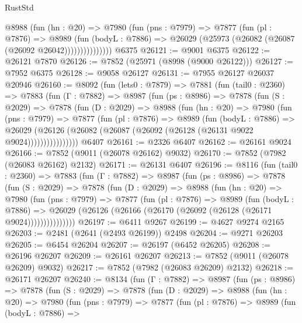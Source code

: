 \begin{lexlean}{RustStd}
\begin{coremodule}
                @8988
                  (fun (hn : @20) =>
                  @7980
                    (fun (pns : @7979) =>
                    @7877
                      (fun (pl : @7876) =>
                      @8989
                        (fun (bodyL : @7886) =>
                        @26029 (@25973 (@26082 (@26087 (@26092 @26042)))))))))))))))
    @6375
@26121 := @9001 @6375
@26122 := @26121 @7870
@26126 := @7852 (@25971 (@8998 (@9000 @26122)))
@26127 := @7952 @6375
@26128 := @9058 @26127
@26131 := @7955 @26127 @26037 @20946
@26160 := @8092
    (fun (lets0 : @7879) =>
    @7881
      (fun (tail0 : @2360) =>
      @7883
        (fun (Γ : @7882) =>
        @8987
          (fun (ps : @8986) =>
          @7878
            (fun (S : @2029) =>
            @7878
              (fun (D : @2029) =>
              @8988
                (fun (hn : @20) =>
                @7980
                  (fun (pns : @7979) =>
                  @7877
                    (fun (pl : @7876) =>
                    @8989
                      (fun (bodyL : @7886) =>
                      @26029
                        (@26126 (@26082 (@26087 (@26092 (@26128 (@26131 @9022 @9024))))))))))))))))
    @6407
@26161 := @2326 @6407
@26162 := @26161 @9024
@26166 := @7852 (@9011 (@26078 @26162) @9032)
@26170 := @7852 (@7982 (@26083 @26162) @2132)
@26171 := @26131 @6407
@26196 := @8116
    (fun (tail0 : @2360) =>
    @7883
      (fun (Γ : @7882) =>
      @8987
        (fun (ps : @8986) =>
        @7878
          (fun (S : @2029) =>
          @7878
            (fun (D : @2029) =>
            @8988
              (fun (hn : @20) =>
              @7980
                (fun (pns : @7979) =>
                @7877
                  (fun (pl : @7876) =>
                  @8989
                    (fun (bodyL : @7886) =>
                    @26029 (@26126 (@26166 (@26170 (@26092 (@26128 (@26171 @9024)))))))))))))))
@26197 := @6411 @9267
@26199 := @4627 @9274 @2165
@26203 := @2481 (@2641 (@2493 @26199)) @2498
@26204 := @9271 @26203
@26205 := @6454 @26204
@26207 := @26197 (@6452 @26205)
@26208 := @26196 @26207
@26209 := @26161 @26207
@26213 := @7852 (@9011 (@26078 @26209) @9032)
@26217 := @7852 (@7982 (@26083 @26209) @2132)
@26218 := @26171 @26207
@26240 := @8134
    (fun (Γ : @7882) =>
    @8987
      (fun (ps : @8986) =>
      @7878
        (fun (S : @2029) =>
        @7878
          (fun (D : @2029) =>
          @8988
            (fun (hn : @20) =>
            @7980
              (fun (pns : @7979) =>
              @7877
                (fun (pl : @7876) =>
                @8989
                  (fun (bodyL : @7886) =>

\end{coremodule}
\end{lexlean}
